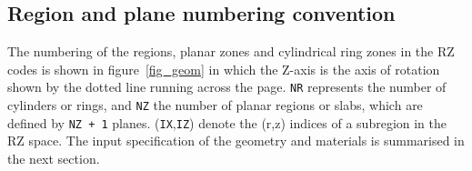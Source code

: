 \documentclass[12pt,twoside]{article}  %
\begin{document}
\newpage
\subsection{Region and plane numbering convention}
    

The numbering of the regions, planar zones and cylindrical
ring zones in the RZ codes is shown in figure~\ref{fig_geom} in which
the Z-axis is the axis of rotation shown by the dotted line running
across the page. \verb+NR+ represents the number of cylinders  or rings, and
\verb+NZ+ the number of planar regions or slabs,
which are defined by {\tt NZ + 1}
planes.
(\verb+IX+,\verb+IZ+) denote the (r,z) indices of a subregion in the
RZ space.
The input specification of the geometry and materials is summarised
in the next section.
\end{document}
